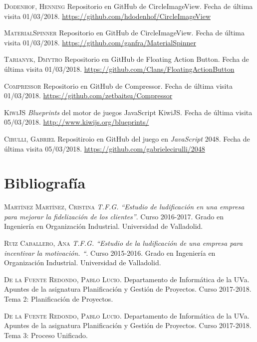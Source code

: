 \documentclass[twoside]{report}
\begin{document}
\begin{thebibliography}{a}
 \textsc{Dodenhof, Henning} 
Repositorio en GitHub de CircleImageView. Fecha de última visita 01/03/2018. \url{https://github.com/hdodenhof/CircleImageView}

 \textsc{MaterialSpinner} 
Repositorio en GitHub de CircleImageView. Fecha de última visita 01/03/2018. \url{https://github.com/ganfra/MaterialSpinner}

 \textsc{Tarianyk, Dmytro} 
Repositorio en GitHub de Floating Action Button. Fecha de última visita 01/03/2018. \url{https://github.com/Clans/FloatingActionButton}

 \textsc{Compressor} 
Repositorio en GitHub de Compressor. Fecha de última visita 01/03/2018. \url{https://github.com/zetbaitsu/Compressor}

 \textsc{KiwiJS} 
\textit{Blueprints} del motor de juegos JavaScript KiwiJS. Fecha de última visita 05/03/2018. \url{http://www.kiwijs.org/blueprints/}

 \textsc{Cirulli, Gabriel} 
Repositiroio en GitHub del juego en \textit{JavaScript} 2048. Fecha de última visita 05/03/2018. \url{https://github.com/gabrielecirulli/2048}







\section{Bibliografía}

 \textsc{Martínez Martínez, Cristina} \textit{T.F.G. “Estudio de ludificación en una empresa para mejorar la fidelización de los clientes”}. Curso 2016-2017. Grado en Ingeniería en Organización Industrial. Universidad de Valladolid. 

 \textsc{Ruiz Caballero, Ana} \textit{T.F.G. “Estudio de la ludificación de una empresa para incentivar la motivación. “}. Curso 2015-2016. Grado en Ingeniería en Organización Industrial. Universidad de Valladolid. 


 \textsc{De la Fuente Redondo, Pablo Lucio}. Departamento de Informática de la UVa. Apuntes de la asignatura Planificación y Gestión de Proyectos. Curso 2017-2018. Tema 2: Planificación de Proyectos.

 \textsc{De la Fuente Redondo, Pablo Lucio}. Departamento de Informática de la UVa. Apuntes de la asignatura Planificación y Gestión de Proyectos. Curso 2017-2018. Tema 3: Proceso Unificado.



\end{thebibliography}
\end{document}
